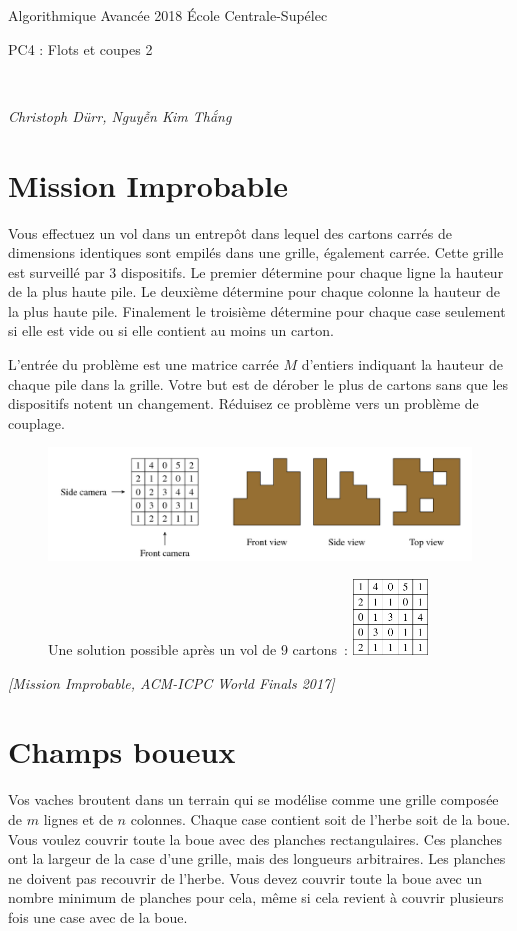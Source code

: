 \documentclass[12pt]{article}
\newcommand{\source}[1]{\begin{flushright}\emph{[#1]}\end{flushright}}
\newcommand{\MakeScribeTop}[1]{
\noindent
\begin{framed}
\noindent
 Algorithmique Avancée 2018
 \hfill
 École Centrale-Supélec
 \\[1em]
 \centerline{ \Large
#1
 }
 \\[1em]
\centerline{  \it Christoph Dürr, Nguyễn Kim Thắng}
\end{framed}
}
\begin{document}
    \MakeScribeTop{PC4 : Flots et coupes 2}

\section{Mission Improbable}

Vous effectuez un vol dans un entrepôt dans lequel des cartons carrés de dimensions identiques sont empilés dans une grille, également carrée.  
Cette grille est surveillé par 3 dispositifs. Le premier détermine pour chaque ligne la hauteur de la plus haute pile.
Le deuxième détermine pour chaque colonne la hauteur de la plus haute pile.
Finalement le troisième détermine pour chaque case seulement si elle est vide ou si elle contient au moins un carton.

L'entrée du problème est une matrice carrée $M$ d'entiers indiquant la hauteur de chaque pile dans la grille.
Votre but est de dérober le plus de cartons sans que les dispositifs notent un changement.  Réduisez ce problème vers un problème de couplage.

\begin{figure}[h]
	\centerline{\includegraphics{mission_impossible_in.png}}
	\centerline{Une solution possible après un vol de 9 cartons~: \includegraphics[width=2cm]{mission_impossible_out.png}}
\end{figure}

\source{Mission Improbable, ACM-ICPC World Finals 2017}

\section{Champs boueux}

Vos vaches broutent dans un terrain qui se modélise comme une grille composée de $m$ lignes et de $n$ colonnes. Chaque case contient soit de l'herbe soit de la boue. Vous voulez couvrir toute la boue avec des planches rectangulaires. Ces planches ont la largeur de la case d'une grille, mais des longueurs arbitraires. Les planches ne doivent pas recouvrir de l'herbe.  Vous devez couvrir toute la boue avec un nombre minimum de planches pour cela, même si cela revient à couvrir plusieurs fois une case avec de la boue. 
\end{document}
